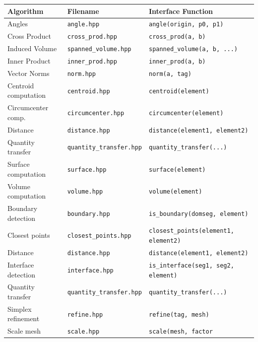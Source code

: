 \begin{table}
 \begin{tabular}{|l|l|l|}
  \hline
   Algorithm & Filename   & Interface Function\\
   \hline
   Angles         & \texttt{angle.hpp}           & \lstinline|angle(origin, p0, p1)| \\
   Cross Product  & \texttt{cross\_prod.hpp}     & \lstinline|cross_prod(a, b)| \\
   Induced Volume & \texttt{spanned\_volume.hpp} & \lstinline|spanned_volume(a, b, ...)| \\
   Inner Product  & \texttt{inner\_prod.hpp}     & \lstinline|inner_prod(a, b)|\\
   Vector Norms   & \texttt{norm.hpp}            & \lstinline|norm(a, tag)| \\
   \hline
   Centroid computation & \texttt{centroid.hpp}           & \lstinline|centroid(element)| \\
   Circumcenter comp.   & \texttt{circumcenter.hpp}       & \lstinline|circumcenter(element)| \\
   Distance             & \texttt{distance.hpp}           & \lstinline|distance(element1, element2)| \\
   Quantity transfer    & \texttt{quantity\_transfer.hpp} & \lstinline|quantity_transfer(...)|\\
   Surface computation  & \texttt{surface.hpp}            & \lstinline|surface(element)| \\
   Volume computation   & \texttt{volume.hpp}             & \lstinline|volume(element)| \\
   \hline
   Boundary detection  & \texttt{boundary.hpp}           & \lstinline|is_boundary(domseg, element)|\\
   Closest points      & \texttt{closest\_points.hpp}    & \lstinline|closest_points(element1, element2)| \\
   Distance            & \texttt{distance.hpp}           & \lstinline|distance(element1, element2)| \\
   Interface detection & \texttt{interface.hpp}          & \lstinline|is_interface(seg1, seg2, element)|\\
   Quantity transfer   & \texttt{quantity\_transfer.hpp} & \lstinline|quantity_transfer(...)|\\
   Simplex refinement  & \texttt{refine.hpp}             & \lstinline|refine(tag, mesh)| \\
   Scale mesh          & \texttt{scale.hpp}              & \lstinline|scale(mesh, factor| \\

\end{tabular}
\end{table}
